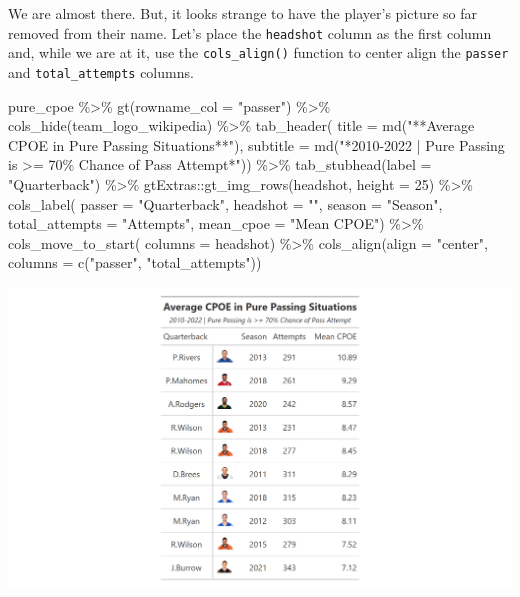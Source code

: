 \documentclass[
  letterpaper,
]{krantz}
\newenvironment{Shaded}{\begin{snugshade}}{\end{snugshade}}
\newcommand{\AttributeTok}[1]{\textcolor[rgb]{0.40,0.45,0.13}{#1}}
\newcommand{\DecValTok}[1]{\textcolor[rgb]{0.68,0.00,0.00}{#1}}
\newcommand{\FunctionTok}[1]{\textcolor[rgb]{0.28,0.35,0.67}{#1}}
\newcommand{\NormalTok}[1]{\textcolor[rgb]{0.00,0.23,0.31}{#1}}
\newcommand{\SpecialCharTok}[1]{\textcolor[rgb]{0.37,0.37,0.37}{#1}}
\newcommand{\StringTok}[1]{\textcolor[rgb]{0.13,0.47,0.30}{#1}}
\begin{document}
We are almost there. But, it looks strange to have the player's picture
so far removed from their name. Let's place the \texttt{headshot} column
as the first column and, while we are at it, use the
\texttt{cols\_align()} function to center align the \texttt{passer} and
\texttt{total\_attempts} columns.

\begin{Shaded}
\begin{Highlighting}[]
\NormalTok{pure\_cpoe }\SpecialCharTok{\%\textgreater{}\%}
  \FunctionTok{gt}\NormalTok{(}\AttributeTok{rowname\_col =} \StringTok{"passer"}\NormalTok{) }\SpecialCharTok{\%\textgreater{}\%}
  \FunctionTok{cols\_hide}\NormalTok{(team\_logo\_wikipedia) }\SpecialCharTok{\%\textgreater{}\%}
  \FunctionTok{tab\_header}\NormalTok{(}
    \AttributeTok{title =} \FunctionTok{md}\NormalTok{(}\StringTok{"**Average CPOE in Pure Passing Situations**"}\NormalTok{),}
    \AttributeTok{subtitle =} \FunctionTok{md}\NormalTok{(}\StringTok{"*2010{-}2022  |  Pure Passing is \textgreater{}= 70\% Chance of Pass Attempt*"}\NormalTok{)) }\SpecialCharTok{\%\textgreater{}\%}
  \FunctionTok{tab\_stubhead}\NormalTok{(}\AttributeTok{label =} \StringTok{"Quarterback"}\NormalTok{) }\SpecialCharTok{\%\textgreater{}\%}
\NormalTok{  gtExtras}\SpecialCharTok{::}\FunctionTok{gt\_img\_rows}\NormalTok{(headshot, }\AttributeTok{height =} \DecValTok{25}\NormalTok{) }\SpecialCharTok{\%\textgreater{}\%}
  \FunctionTok{cols\_label}\NormalTok{(}
    \AttributeTok{passer =} \StringTok{"Quarterback"}\NormalTok{,}
    \AttributeTok{headshot =} \StringTok{""}\NormalTok{,}
    \AttributeTok{season =} \StringTok{"Season"}\NormalTok{,}
    \AttributeTok{total\_attempts =} \StringTok{"Attempts"}\NormalTok{,}
    \AttributeTok{mean\_cpoe =} \StringTok{"Mean CPOE"}\NormalTok{) }\SpecialCharTok{\%\textgreater{}\%}
  \FunctionTok{cols\_move\_to\_start}\NormalTok{(}
    \AttributeTok{columns =}\NormalTok{ headshot) }\SpecialCharTok{\%\textgreater{}\%}
  \FunctionTok{cols\_align}\NormalTok{(}\AttributeTok{align =} \StringTok{"center"}\NormalTok{, }\AttributeTok{columns =} \FunctionTok{c}\NormalTok{(}\StringTok{"passer"}\NormalTok{, }\StringTok{"total\_attempts"}\NormalTok{))}
\end{Highlighting}
\end{Shaded}

\includegraphics[width=6.61in,height=\textheight]{images/gt_table_3.png}
\end{document}
